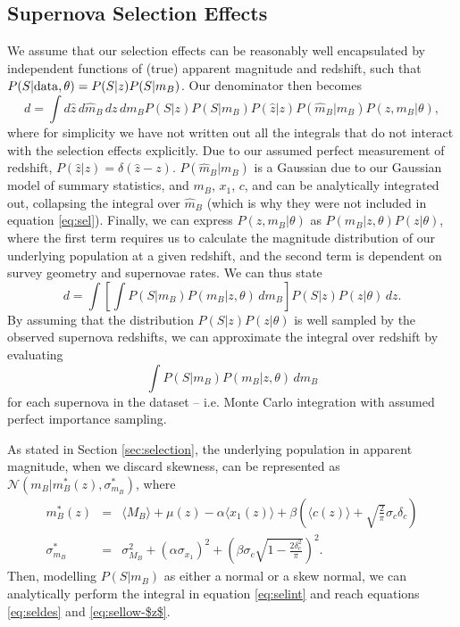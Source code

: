 \documentclass[a4paper,fleqn,usenatbib,manuscript]{emulateapj}
\begin{document}
\subsection{Supernova Selection Effects}
\label{app:selection2}
We assume that our selection effects can be reasonably well encapsulated by independent functions of (true) apparent magnitude and redshift, such that $P(S|{\rm data}, \theta) = P(S|z) P(S|m_B)$. Our denominator then becomes
\begin{equation}
d = \int d\hat{z} \, d\hat{m}_B \, dz \, dm_B P(S|z) P(S|m_B) P(\hat{z}|z) P(\hat{m}_B|m_B) P(z, m_B | \theta), \label{eq:sel}
\end{equation}
where for simplicity we have not written out all the integrals that do not interact with the selection effects explicitly. Due to our assumed perfect measurement of redshift, $P(\hat{z}|z) = \delta(\hat{z} - z)$. $P(\hat{m}_B | m_B)$ is a Gaussian due to our Gaussian model of summary statistics, and $m_B$, $x_1$, $c$, and can be analytically integrated out, collapsing the integral over $\hat{m}_B$ (which is why they were not included in equation \eqref{eq:sel}). Finally, we can express $P(z, m_B | \theta)$ as  $P(m_B | z, \theta) P(z | \theta)$, where the first term requires us to calculate the magnitude distribution of our underlying population at a given redshift, and the second term is dependent on survey geometry and supernovae rates. We can thus state
\begin{equation}
d = \int \left[ \int P(S|m_B) P(m_B | z, \theta)\, dm_B \right] P(S|z)P(z|\theta)\, dz.
\end{equation}
By assuming that the distribution $P(S|z)P(z|\theta)$ is well sampled by the observed supernova redshifts, we can approximate the integral over redshift by evaluating
\begin{equation}
\int P(S|m_B) P(m_B | z, \theta)\, dm_B \label{eq:selint}
\end{equation}
for each supernova in the dataset -- i.e. Monte Carlo integration with assumed perfect importance sampling.

As stated in Section \ref{sec:selection}, the underlying population in apparent magnitude, when we discard skewness, can be represented as $\mathcal{N}(m_B|m_B^*(z), \sigma^*_{m_B})$, where
\begin{eqnarray}
m_B^*(z) &=& \langle M_B \rangle + \mu(z) - \alpha \langle x_1(z) \rangle + \beta \left(\langle c(z) \rangle + \sqrt{\frac{2}{\pi}}\sigma_c \delta_c\right)\label{eq:disc1} \\
\sigma^*_{m_B} &=& \sigma_{M_B}^2 + (\alpha \sigma_{x_1})^2 +  \left(\beta \sigma_c \sqrt{1 - \frac{2\delta_c^2}{\pi}}\right)^2. \label{eq:disc2}
\end{eqnarray}
Then, modelling $P(S|m_B)$ as either a normal or a skew normal, we can analytically perform the integral in equation \eqref{eq:selint} and reach equations \eqref{eq:seldes} and \eqref{eq:sellow-$z$}.
\end{document}
